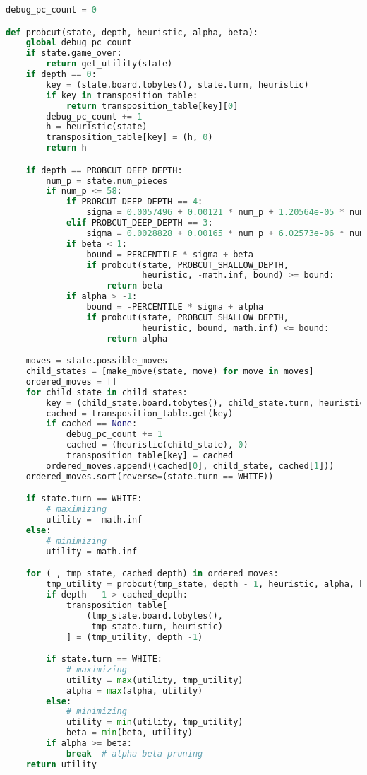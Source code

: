 \begin{lstlisting}[language=Python]
debug_pc_count = 0

def probcut(state, depth, heuristic, alpha, beta):
    global debug_pc_count
    if state.game_over:
        return get_utility(state)
    if depth == 0:
        key = (state.board.tobytes(), state.turn, heuristic)
        if key in transposition_table:
            return transposition_table[key][0]
        debug_pc_count += 1
        h = heuristic(state)
        transposition_table[key] = (h, 0)
        return h

    if depth == PROBCUT_DEEP_DEPTH:
        num_p = state.num_pieces
        if num_p <= 58:
            if PROBCUT_DEEP_DEPTH == 4:
                sigma = 0.0057496 + 0.00121 * num_p + 1.20564e-05 * num_p**2
            elif PROBCUT_DEEP_DEPTH == 3:
                sigma = 0.0028828 + 0.00165 * num_p + 6.02573e-06 * num_p**2
            if beta < 1:
                bound = PERCENTILE * sigma + beta
                if probcut(state, PROBCUT_SHALLOW_DEPTH,
                           heuristic, -math.inf, bound) >= bound:
                    return beta
            if alpha > -1:
                bound = -PERCENTILE * sigma + alpha
                if probcut(state, PROBCUT_SHALLOW_DEPTH,
                           heuristic, bound, math.inf) <= bound:
                    return alpha

    moves = state.possible_moves
    child_states = [make_move(state, move) for move in moves]
    ordered_moves = []
    for child_state in child_states:
        key = (child_state.board.tobytes(), child_state.turn, heuristic)
        cached = transposition_table.get(key)
        if cached == None:
            debug_pc_count += 1
            cached = (heuristic(child_state), 0)
            transposition_table[key] = cached
        ordered_moves.append((cached[0], child_state, cached[1]))
    ordered_moves.sort(reverse=(state.turn == WHITE))

    if state.turn == WHITE:
        # maximizing
        utility = -math.inf
    else:
        # minimizing
        utility = math.inf

    for (_, tmp_state, cached_depth) in ordered_moves:
        tmp_utility = probcut(tmp_state, depth - 1, heuristic, alpha, beta)
        if depth - 1 > cached_depth:
            transposition_table[
                (tmp_state.board.tobytes(),
                 tmp_state.turn, heuristic)
            ] = (tmp_utility, depth -1)

        if state.turn == WHITE:
            # maximizing
            utility = max(utility, tmp_utility)
            alpha = max(alpha, utility)
        else:
            # minimizing
            utility = min(utility, tmp_utility)
            beta = min(beta, utility)
        if alpha >= beta:
            break  # alpha-beta pruning
    return utility
\end{lstlisting}

